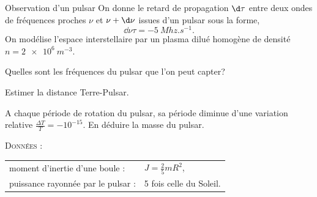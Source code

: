 \begin{exo}[PC][3][colle]{Observation d'un pulsar}
  On donne le retard de propagation $\d \tau$ entre deux ondes de fréquences proches $\nu$ et $\nu + \d \nu$ issues d'un pulsar sous la forme, 
  \begin{equation}
    \dd{\nu}{\tau}=-\SI{5}{Mhz.s^{-1}}.
  \end{equation}
On modélise l'espace interstellaire par un plasma dilué homogène de densité $n=\SI{2e6}{m^{-3}}$.
\begin{quest}
  \item	Quelles sont les fréquences du pulsar que l'on peut capter?
  \item Estimer la distance Terre-Pulsar.
  \item A chaque période de rotation du pulsar, sa période diminue d'une variation relative $\frac{\Delta T}{T}=-10^{-15}$. En déduire la masse du pulsar.
\end{quest}
\textsc{Données} :
\begin{tabular}{ll}
  moment d'inertie d'une boule : & $J=\textstyle\frac{2}{5} m R^2$, \\ 
  puissance rayonnée par le pulsar : & 5 fois celle du Soleil.
\end{tabular}

\end{exo}


